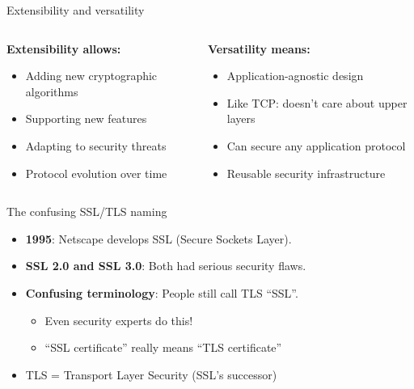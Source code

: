 \documentclass[aspectratio=169, lualatex, handout]{beamer}
\begin{document}
\begin{frame}{Extensibility and versatility}
	\begin{columns}[c]
		\begin{column}{0.5\textwidth}
			\textbf{Extensibility allows:}
			\begin{itemize}
				\item Adding new cryptographic algorithms
				\item Supporting new features
				\item Adapting to security threats
				\item Protocol evolution over time
			\end{itemize}
		\end{column}
		\begin{column}{0.5\textwidth}
			\textbf{Versatility means:}
			\begin{itemize}
				\item Application-agnostic design
				\item Like TCP: doesn't care about upper layers
				\item Can secure any application protocol
				\item Reusable security infrastructure
			\end{itemize}
		\end{column}
	\end{columns}
\end{frame}

\begin{frame}{The confusing SSL/TLS naming}
	\begin{itemize}
		\item \textbf{1995}: Netscape develops SSL (Secure Sockets Layer).
		\item \textbf{SSL 2.0 and SSL 3.0}: Both had serious security flaws.
		\item \textbf{Confusing terminology}: People still call TLS ``SSL''.
		      \begin{itemize}
			      \item Even security experts do this!
			      \item ``SSL certificate'' really means ``TLS certificate''
		      \end{itemize}
		\item TLS = Transport Layer Security (SSL's successor)
	\end{itemize}
\end{frame}
\end{document}
